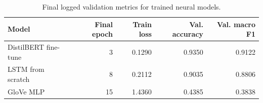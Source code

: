 \begin{table}
\caption{Final logged validation metrics for trained neural models.}
\label{tab:training-final-generated}
\begin{tabular}{lrrrr}
\toprule
Model & Final epoch & Train loss & Val. accuracy & Val. macro F1 \\
\midrule
DistilBERT fine-tune & 3 & 0.1290 & 0.9350 & 0.9122 \\
LSTM from scratch & 8 & 0.2112 & 0.9035 & 0.8806 \\
GloVe MLP & 15 & 1.4360 & 0.4385 & 0.3838 \\
\bottomrule
\end{tabular}
\end{table}
